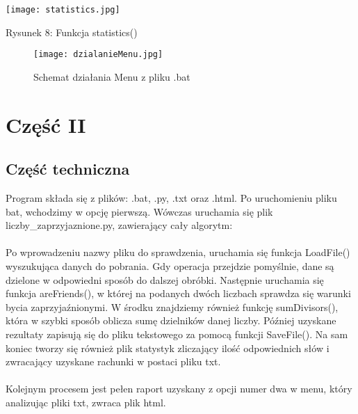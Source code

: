 \documentclass[12pt,a4paper]{article}
\begin{document}
	    
	\newpage
	
	    \begin{center}
	    \texttt{[image: statistics.jpg]}
	    \newline \newline
	    \begin{caption}
	    \caption{Rysunek 8: Funkcja statistics()}
	    \end{caption}
	    
	    \end{center}
	    

	\newpage
	\begin{figure}[h]
	    \begin{center}
	    \texttt{[image: dzialanieMenu.jpg]}
	    \caption{Schemat działania Menu z pliku .bat}
	    \end{center}
	    \end{figure}
	\newpage
	\section{Część II}
	\subsection{Część techniczna}
	\hspace{20} Program składa się z plików: .bat, .py, .txt oraz .html. Po uruchomieniu pliku bat, wchodzimy w opcję pierwszą. Wówczas uruchamia się plik liczby\_zaprzyjaznione.py, zawierający cały algorytm: \\ \\
	Po wprowadzeniu nazwy pliku do sprawdzenia, uruchamia się funkcja LoadFile() wyszukująca danych do pobrania. Gdy operacja przejdzie pomyślnie, dane są dzielone w odpowiedni sposób do dalszej obróbki. Następnie uruchamia się funkcja areFriends(), w której na podanych dwóch liczbach sprawdza się warunki bycia zaprzyjaźnionymi. W środku znajdziemy również funkcję sumDivisors(), która w szybki sposób oblicza sumę dzielników danej liczby. Później uzyskane rezultaty zapisują się do pliku tekstowego za pomocą funkcji SaveFile(). Na sam koniec tworzy się również plik statystyk zliczający ilość odpowiednich słów i zwracający uzyskane rachunki w postaci pliku txt.\\ \\
	Kolejnym procesem jest pełen raport uzyskany z opcji numer dwa w menu, który analizując pliki txt, zwraca plik html. \\ \\ 
	
\end{document}
